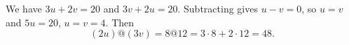 We have $3u+2v=20$ and $3v+2u=20$. Subtracting gives $u-v=0$, so $u=v$ and $5u=20$, $u=v=4$. Then
\[
(2u)@(3v)=8@12=3\cdot8+2\cdot12=\boxed{48}.
\]
